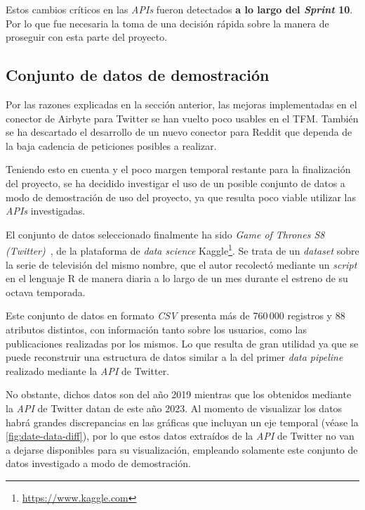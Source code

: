 Estos cambios críticos en las \textit{APIs} fueron detectados \textbf{a lo largo del \textit{Sprint} 10}. Por lo que fue necesaria la toma de una decisión rápida sobre la manera de proseguir con esta parte del proyecto.

\subsection{Conjunto de datos de demostración}

Por las razones explicadas en la sección anterior, las mejoras implementadas en el conector de Airbyte para Twitter se han vuelto poco usables en el TFM. También se ha descartado el desarrollo de un nuevo conector para Reddit que dependa de la baja cadencia de peticiones posibles a realizar.

Teniendo esto en cuenta y el poco margen temporal restante para la finalización del proyecto, se ha decidido investigar el uso de un posible conjunto de datos a modo de demostración de uso del proyecto, ya que resulta poco viable utilizar las \textit{APIs} investigadas.

El conjunto de datos seleccionado finalmente ha sido \textit{Game of Thrones S8 (Twitter)}~\cite{got8}, de la plataforma de \textit{data science} Kaggle\footnote{\url{https://www.kaggle.com}}. Se trata de un \textit{dataset} sobre la serie de televisión del mismo nombre, que el autor recolectó mediante un \textit{script} en el lenguaje R de manera diaria a lo largo de un mes durante el estreno de su octava temporada.

Este conjunto de datos en formato \textit{CSV} presenta más de 760\,000 registros y 88 atributos distintos, con información tanto sobre los usuarios, como las publicaciones realizadas por los mismos. Lo que resulta de gran utilidad ya que se puede reconstruir una estructura de datos similar a la del primer \textit{data pipeline} realizado mediante la \textit{API} de Twitter.

No obstante, dichos datos son del año 2019 mientras que los obtenidos mediante la \textit{API} de Twitter datan de este año 2023. Al momento de visualizar los datos habrá grandes discrepancias en las gráficas que incluyan un eje temporal (véase la \autoref{fig:date-data-diff}), por lo que estos datos extraídos de la \textit{API} de Twitter no van a dejarse disponibles para su visualización, empleando solamente este conjunto de datos investigado a modo de demostración.


